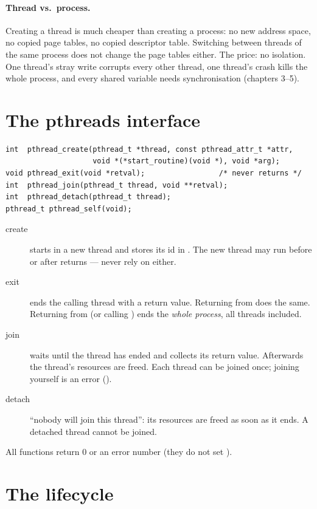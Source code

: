 \paragraph{Thread vs.\ process.} Creating a thread is much cheaper than
creating a process: no new address space, no copied page tables, no
copied descriptor table. Switching between threads of the same process
does not change the page tables either. The price: no isolation. One
thread's stray write corrupts every other thread, one thread's crash kills
the whole process, and every shared variable needs synchronisation
(chapters 3--5).

\section{The pthreads interface}

\begin{lstlisting}
int  pthread_create(pthread_t *thread, const pthread_attr_t *attr,
                    void *(*start_routine)(void *), void *arg);
void pthread_exit(void *retval);                 /* never returns */
int  pthread_join(pthread_t thread, void **retval);
int  pthread_detach(pthread_t thread);
pthread_t pthread_self(void);
\end{lstlisting}

\begin{description}
  \item[create] starts  in a new thread and
    stores its id in . The new thread may run before or
    after  returns --- never rely on either.
  \item[exit] ends the calling thread with a return value. Returning from
     does the same. Returning from  (or
    calling ) ends the \emph{whole process}, all threads
    included.
  \item[join] waits until the thread has ended and collects its return
    value. Afterwards the thread's resources are freed. Each thread can be
    joined once; joining yourself is an error ().
  \item[detach] ``nobody will join this thread'': its resources are freed
    as soon as it ends. A detached thread cannot be joined.
\end{description}

All functions return 0 or an error number (they do not set ).

\section{The lifecycle}

